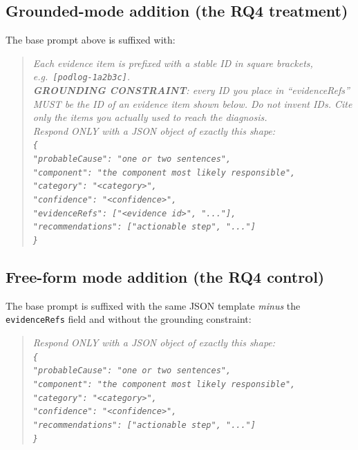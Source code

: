 \documentclass[sigconf, nonacm=true, anonymous=false, review=false]{acmart}
\begin{document}
\subsection{Grounded-mode addition (the RQ4 treatment)}

The base prompt above is suffixed with:

\begin{quote}\small\itshape
Each evidence item is prefixed with a stable ID in square brackets,
e.g.\ \texttt{[podlog-1a2b3c]}.\\[0.3em]
\textbf{GROUNDING CONSTRAINT}: every ID you place in
``evidenceRefs'' MUST be the ID of an evidence item shown below.
Do not invent IDs. Cite only the items you actually used to reach
the diagnosis.\\[0.3em]
Respond ONLY with a JSON object of exactly this shape:\\
\texttt{\{}\\
\hspace*{1em}\texttt{"probableCause": "one or two sentences",}\\
\hspace*{1em}\texttt{"component": "the component most likely responsible",}\\
\hspace*{1em}\texttt{"category": "<category>",}\\
\hspace*{1em}\texttt{"confidence": "<confidence>",}\\
\hspace*{1em}\texttt{"evidenceRefs": ["<evidence id>", "..."],}\\
\hspace*{1em}\texttt{"recommendations": ["actionable step", "..."]}\\
\texttt{\}}
\end{quote}

\subsection{Free-form mode addition (the RQ4 control)}

The base prompt is suffixed with the same JSON template
\emph{minus} the \texttt{evidenceRefs} field and without the
grounding constraint:

\begin{quote}\small\itshape
Respond ONLY with a JSON object of exactly this shape:\\
\texttt{\{}\\
\hspace*{1em}\texttt{"probableCause": "one or two sentences",}\\
\hspace*{1em}\texttt{"component": "the component most likely responsible",}\\
\hspace*{1em}\texttt{"category": "<category>",}\\
\hspace*{1em}\texttt{"confidence": "<confidence>",}\\
\hspace*{1em}\texttt{"recommendations": ["actionable step", "..."]}\\
\texttt{\}}
\end{quote}
\end{document}
